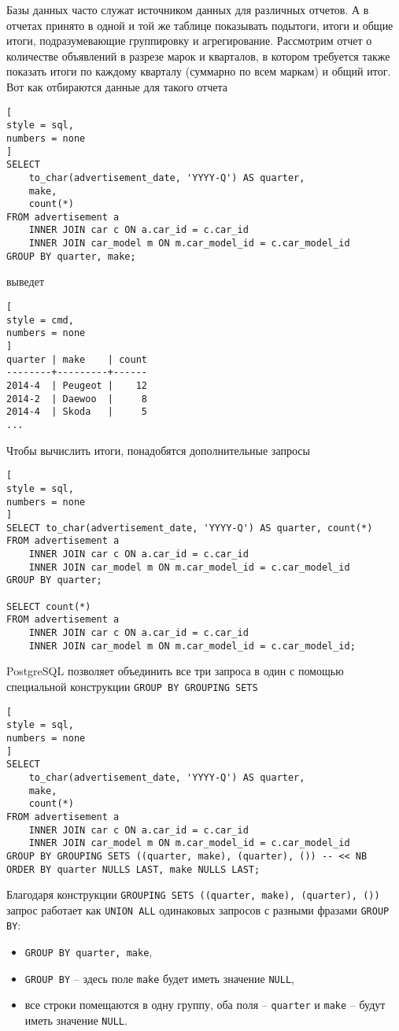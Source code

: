 \documentclass[%
	11pt,
	a4paper,
	utf8,
		]{article}
\begin{document}
Базы данных часто служат источником данных для различных отчетов. А в отчетах принято в одной и той же таблице показывать подытоги, итоги и общие итоги, подразумевающие группировку и агрегирование. Рассмотрим отчет о количестве объявлений в разрезе марок и кварталов, в котором требуется также показать итоги по каждому кварталу (суммарно по всем маркам) и общий итог. Вот как отбираются данные для такого отчета
\begin{lstlisting}[
style = sql,
numbers = none
]
SELECT
    to_char(advertisement_date, 'YYYY-Q') AS quarter,
    make,
    count(*)
FROM advertisement a
    INNER JOIN car c ON a.car_id = c.car_id
    INNER JOIN car_model m ON m.car_model_id = c.car_model_id
GROUP BY quarter, make;
\end{lstlisting}
выведет
\begin{lstlisting}[
style = cmd,
numbers = none
]
quarter | make    | count
--------+---------+------
2014-4  | Peugeot |    12
2014-2  | Daewoo  |     8
2014-4  | Skoda   |     5
... 
\end{lstlisting}

Чтобы вычислить итоги, понадобятся дополнительные запросы
\begin{lstlisting}[
style = sql,
numbers = none
]
SELECT to_char(advertisement_date, 'YYYY-Q') AS quarter, count(*)
FROM advertisement a
    INNER JOIN car c ON a.car_id = c.car_id
    INNER JOIN car_model m ON m.car_model_id = c.car_model_id
GROUP BY quarter;

SELECT count(*)
FROM advertisement a
    INNER JOIN car c ON a.car_id = c.car_id
    INNER JOIN car_model m ON m.car_model_id = c.car_model_id;
\end{lstlisting}

PostgreSQL позволяет объединить все три запроса в один с помощью специальной конструкции \texttt{GROUP BY GROUPING SETS}
\begin{lstlisting}[
style = sql,
numbers = none
]
SELECT
    to_char(advertisement_date, 'YYYY-Q') AS quarter,
    make,
    count(*)
FROM advertisement a
    INNER JOIN car c ON a.car_id = c.car_id
    INNER JOIN car_model m ON m.car_model_id = c.car_model_id
GROUP BY GROUPING SETS ((quarter, make), (quarter), ()) -- << NB
ORDER BY quarter NULLS LAST, make NULLS LAST;
\end{lstlisting}

Благодаря конструкции \texttt{GROUPING SETS ((quarter, make), (quarter), ())} запрос работает как \texttt{UNION ALL} одинаковых запросов с разными фразами \texttt{GROUP BY}:
\begin{itemize}
	\item \texttt{GROUP BY quarter, make},
	
	\item \texttt{GROUP BY} -- здесь поле \texttt{make} будет иметь значение \texttt{NULL},
	
	\item все строки помещаются в одну группу, оба поля -- \texttt{quarter} и \texttt{make} -- будут иметь значение \texttt{NULL}.
\end{itemize}
\end{document}
